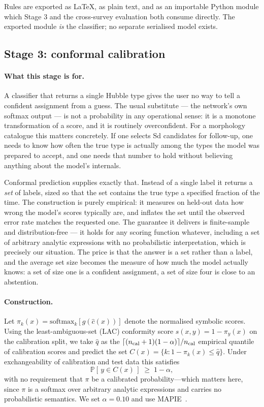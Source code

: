 \documentclass[11pt]{article}
\begin{document}
Rules are exported as \LaTeX, as plain text, and as an importable Python
module which Stage 3 and the cross-survey evaluation both consume directly.
The exported module \emph{is} the classifier; no separate serialised model
exists.

\subsection{Stage 3: conformal calibration}
\label{sec:stage3}

\paragraph{What this stage is for.}
A classifier that returns a single Hubble type gives the user no way to tell a
confident assignment from a guess. The usual substitute --- the network's own
softmax output --- is not a probability in any operational sense: it is a
monotone transformation of a score, and it is routinely overconfident. For a
morphology catalogue this matters concretely. If one selects Sd candidates for
follow-up, one needs to know how often the true type is actually among the
types the model was prepared to accept, and one needs that number to hold
without believing anything about the model's internals.

Conformal prediction supplies exactly that. Instead of a single label it
returns a \emph{set} of labels, sized so that the set contains the true type a
specified fraction of the time. The construction is purely empirical: it
measures on held-out data how wrong the model's scores typically are, and
inflates the set until the observed error rate matches the requested one. The
guarantee it delivers is finite-sample and distribution-free --- it holds for
any scoring function whatever, including a set of arbitrary analytic
expressions with no probabilistic interpretation, which is precisely our
situation. The price is that the answer is a set rather than a label, and the
average set size becomes the measure of how much the model actually knows: a
set of size one is a confident assignment, a set of size four is close to an
abstention.

\paragraph{Construction.}
Let $\pi_k(x) = \mathrm{softmax}_k[g(\hat c(x))]$ denote the normalised
symbolic scores. Using the least-ambiguous-set (LAC) conformity score
$s(x,y) = 1 - \pi_y(x)$ on the calibration split, we take $\hat q$ as the
$\lceil (n_{\rm cal}+1)(1-\alpha)\rceil / n_{\rm cal}$ empirical quantile of
calibration scores and predict the set
$C(x) = \{k : 1 - \pi_k(x) \le \hat q\}$. Under exchangeability of calibration
and test data this satisfies
\begin{equation}
\mathbb{P}\!\left[\,y \in C(x)\,\right] \;\ge\; 1-\alpha ,
\label{eq:coverage}
\end{equation}
with no requirement that $\pi$ be a calibrated probability---which matters
here, since $\pi$ is a softmax over arbitrary analytic expressions and carries
no probabilistic semantics. We set $\alpha = 0.10$ and use
MAPIE~\citep{taquet2022}.
\end{document}
